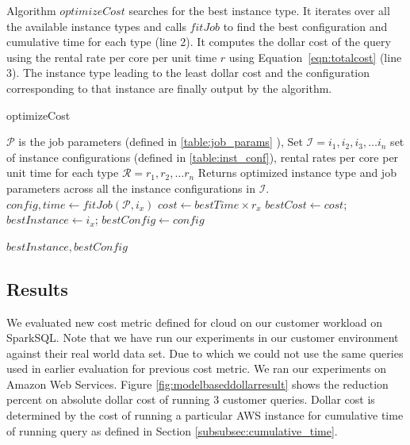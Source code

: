 Algorithm $optimizeCost$ searches for the best instance type. It iterates over all the available instance types and calls $fitJob$ to find the best configuration and cumulative time for each type (line 2). It computes the dollar cost  of the query using the rental rate per core per unit time $r$ using Equation~\ref{eqn:totalcost} (line 3). The instance type leading to the least dollar cost and the configuration corresponding to that instance are finally output by the algorithm.


\begin{algorithm}
\caption{optimizeCost} \label{cost_optimize}
\begin{algorithmic}[1]
\footnotesize
\REQUIRE $\mathcal{P}$ is the job parameters (defined in \ref{table:job_params} ), Set $\mathcal{I} = {i_1, i_2, i_3, \ldots i_n} $ set of instance configurations (defined in \ref{table:inst_conf}), rental rates per core per unit time for each type $\mathcal{R}={r_1, r_2, \ldots r_n}$
\ENSURE Returns optimized instance type and job parameters across all the instance configurations in $\mathcal{I}$.
	\STATE $config, time \gets fitJob(\mathcal{P}, i_x)$
	\STATE $cost \gets  bestTime \times r_x$  
		\STATE $bestCost \gets cost$;
		$bestInstance \gets i_x$;
		$bestConfig \gets config$
	\ENDIF
\ENDFOR

\RETURN $bestInstance, bestConfig$
\end{algorithmic}
\end{algorithm}

\subsection{Results}

We evaluated new cost metric defined for cloud on our customer workload on SparkSQL. Note that we have run our experiments in our customer environment against their real world data set. Due to which we could not use the same queries used in earlier evaluation for previous cost metric. We ran our experiments on Amazon Web Services. Figure \ref{fig:modelbaseddollarresult} shows the reduction percent on absolute dollar cost of running 3 customer queries. Dollar cost is determined by the cost of running a particular AWS instance for cumulative time of running query as defined in Section \ref{subsubsec:cumulative_time}.

